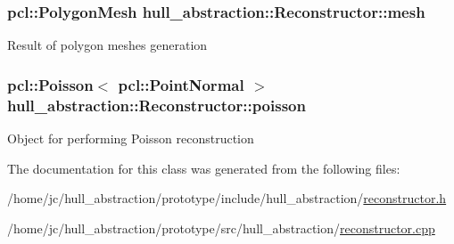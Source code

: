 \subsubsection[{\texorpdfstring{mesh}{mesh}}]{\setlength{\rightskip}{0pt plus 5cm}pcl\+::\+Polygon\+Mesh hull\+\_\+abstraction\+::\+Reconstructor\+::mesh\hspace{0.3cm}{\ttfamily [private]}}\hypertarget{classhull__abstraction_1_1_reconstructor_af0818936b15dd13f3a9fa3e70734cd57}{}\label{classhull__abstraction_1_1_reconstructor_af0818936b15dd13f3a9fa3e70734cd57}
Result of polygon meshes generation 
\subsubsection[{\texorpdfstring{poisson}{poisson}}]{\setlength{\rightskip}{0pt plus 5cm}pcl\+::\+Poisson$<$ pcl\+::\+Point\+Normal $>$ hull\+\_\+abstraction\+::\+Reconstructor\+::poisson\hspace{0.3cm}{\ttfamily [private]}}\hypertarget{classhull__abstraction_1_1_reconstructor_a60dfa765833af8d05f1426be0e96adb0}{}\label{classhull__abstraction_1_1_reconstructor_a60dfa765833af8d05f1426be0e96adb0}
Object for performing Poisson reconstruction 

The documentation for this class was generated from the following files\+:\begin{DoxyCompactItemize}
\item 
/home/jc/hull\+\_\+abstraction/prototype/include/hull\+\_\+abstraction/\hyperlink{prototype_2include_2hull__abstraction_2reconstructor_8h}{reconstructor.\+h}\item 
/home/jc/hull\+\_\+abstraction/prototype/src/hull\+\_\+abstraction/\hyperlink{prototype_2src_2hull__abstraction_2reconstructor_8cpp}{reconstructor.\+cpp}\end{DoxyCompactItemize}
